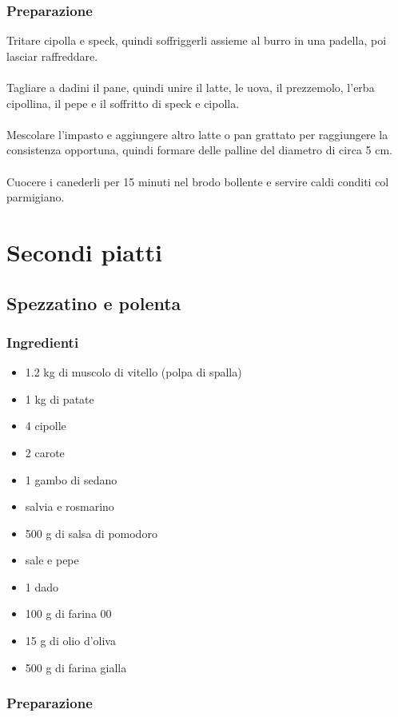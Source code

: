 \documentclass[12pt, a4paper]{article}
\begin{document}
\subsubsection{Preparazione}
	Tritare cipolla e speck, quindi soffriggerli assieme al burro in una padella, poi lasciar raffreddare.\\\\
	Tagliare a dadini il pane, quindi unire il latte, le uova, il prezzemolo, l'erba cipollina, il pepe
	e il soffritto di speck e cipolla.\\\\
	Mescolare l'impasto e aggiungere altro latte o pan grattato per raggiungere la consistenza opportuna,
	quindi formare delle palline del diametro di circa 5 cm.\\\\
	Cuocere i canederli per 15 minuti nel brodo bollente e servire caldi conditi col parmigiano.
\clearpage

\section{Secondi piatti}

\subsection{Spezzatino e polenta}

\subsubsection{Ingredienti}
\begin{itemize}
\item   1.2 kg di muscolo di vitello (polpa di spalla)
\item 	1 kg di patate
\item 	4 cipolle
\item 	2 carote
\item 	1 gambo di sedano
\item 	salvia e rosmarino
\item 	500 g di salsa di pomodoro
\item 	sale e pepe
\item 	1 dado
\item 	100 g di farina 00
\item 	15 g di olio d'oliva
\item 	500 g di farina gialla
\end{itemize}

\clearpage
\subsubsection{Preparazione}
\end{document}
